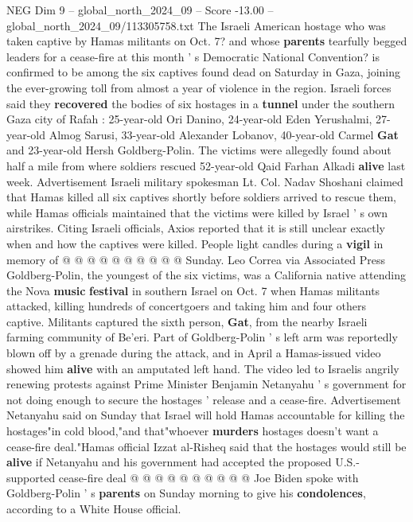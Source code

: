 \begin{textsample}{NEG Dim 9 – global\_north\_2024\_09 – Score -13.00 – global\_north\_2024\_09/113305758.txt}  \label{ex:f9_neg_004}
The Israeli American hostage who was taken captive by Hamas militants on Oct. 7? and whose \textbf{parents} tearfully begged leaders for a cease-fire at this month ' s Democratic National Convention? is confirmed to be among the six captives found dead on Saturday in Gaza, joining the ever-growing toll from almost a year of violence in the region.
Israeli forces said they \textbf{recovered} the bodies of six hostages in a \textbf{tunnel} under the southern Gaza city of Rafah : 25-year-old Ori Danino, 24-year-old Eden Yerushalmi, 27-year-old Almog Sarusi, 33-year-old Alexander Lobanov, 40-year-old Carmel \textbf{Gat} and 23-year-old Hersh Goldberg-Polin.
The victims were allegedly found about half a mile from where soldiers rescued 52-year-old Qaid Farhan Alkadi \textbf{alive} last week.
Advertisement Israeli military spokesman Lt.
Col.
Nadav Shoshani claimed that Hamas killed all six captives shortly before soldiers arrived to rescue them, while Hamas officials maintained that the victims were killed by Israel ' s own airstrikes.
Citing Israeli officials, Axios reported that it is still unclear exactly when and how the captives were killed.
People light candles during a \textbf{vigil} in memory of @ @ @ @ @ @ @ @ @ @ Sunday.
Leo Correa via Associated Press Goldberg-Polin, the youngest of the six victims, was a California native attending the Nova \textbf{music} \textbf{festival} in southern Israel on Oct. 7 when Hamas militants attacked, killing hundreds of concertgoers and taking him and four others captive.
Militants captured the sixth person, \textbf{Gat}, from the nearby Israeli farming community of Be'eri.
Part of Goldberg-Polin ' s left arm was reportedly blown off by a grenade during the attack, and in April a Hamas-issued video showed him \textbf{alive} with an amputated left hand.
The video led to Israelis angrily renewing protests against Prime Minister Benjamin Netanyahu ' s government for not doing enough to secure the hostages ' release and a cease-fire.
Advertisement Netanyahu said on Sunday that Israel will hold Hamas accountable for killing the hostages"in cold blood,"and that"whoever \textbf{murders} hostages doesn't want a cease-fire deal."Hamas official Izzat al-Risheq said that the hostages would still be \textbf{alive} if Netanyahu and his government had accepted the proposed U.S.-supported cease-fire deal @ @ @ @ @ @ @ @ @ @ Joe Biden spoke with Goldberg-Polin ' s \textbf{parents} on Sunday morning to give his \textbf{condolences}, according to a White House official.

\end{textsample}
